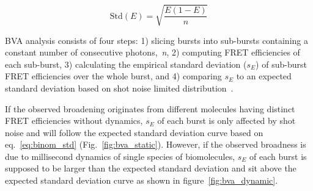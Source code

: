 \begin{equation}
\label{eq:binom_std}
\operatorname{Std(\textit{E})} = {\sqrt{\frac{E(1 - E)}{n}}}
\end{equation}

BVA analysis consists of four steps: 1) slicing bursts into sub-bursts containing a constant number of consecutive photons,~\textit{n}, 2) computing FRET efficiencies of each sub-burst, 3) calculating the empirical standard deviation ($s_E$) of sub-burst FRET efficiencies over the whole burst, and 4) comparing $s_E$ to an expected standard deviation based on shot noise limited distribution~\cite{Torella_2011}. 

If the observed broadening originates from different molecules having distinct FRET efficiencies without dynamics, $s_E$ of each burst is only affected by shot noise and will follow the expected standard deviation curve based on eq.~\ref{eq:binom_std} (Fig.~\ref{fig:bva_static}). However, if the observed broadness is due to millisecond dynamics of single species of biomolecules, $s_E$ of each burst is supposed to be larger than the expected standard deviation and sit above the expected standard deviation curve as shown in figure~\ref{fig:bva_dynamic}.
